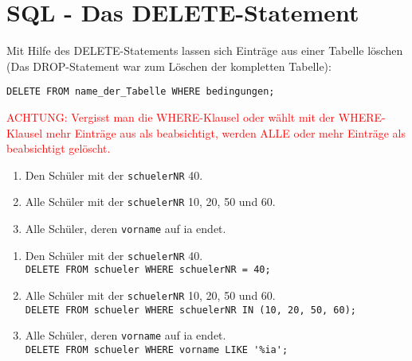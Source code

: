 \section[DELETE-Statement]{SQL - Das DELETE-Statement}
Mit Hilfe des DELETE-Statements lassen sich Einträge aus einer Tabelle löschen (Das DROP-Statement war zum Löschen der kompletten Tabelle):
\begin{tcolorbox}[title=DELETE-Statement]
	\lstinline!DELETE FROM name_der_Tabelle WHERE bedingungen;!
\end{tcolorbox}
\textcolor{red}{ACHTUNG: Vergisst man die WHERE-Klausel oder wählt mit der WHERE-Klausel mehr Einträge aus als beabsichtigt, werden ALLE oder mehr Einträge als beabsichtigt gelöscht.}

\begin{Exercise}[title={Lösche folgende Einträge aus der Datenbank:}, label=Delete]
	\begin{enumerate}
		\item Den Schüler mit der \lstinline!schuelerNR! 40.
		\item Alle Schüler mit der \lstinline!schuelerNR! 10, 20, 50 und 60.
		\item Alle Schüler, deren \lstinline!vorname! auf ia endet.
	\end{enumerate}
\end{Exercise}
\begin{Answer}[ref=Delete]
	\begin{enumerate}
		\item Den Schüler mit der \lstinline!schuelerNR! 40.\\
		\lstinline!DELETE FROM schueler WHERE schuelerNR = 40;!
		\item Alle Schüler mit der \lstinline!schuelerNR! 10, 20, 50 und 60.\\
		\lstinline!DELETE FROM schueler WHERE schuelerNR IN (10, 20, 50, 60);!
		\item Alle Schüler, deren \lstinline!vorname! auf ia endet.\\
		\lstinline!DELETE FROM schueler WHERE vorname LIKE '%ia';!
	\end{enumerate}
\end{Answer}